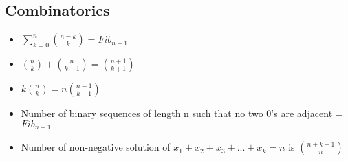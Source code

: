 \subsection{Combinatorics}
\vspace{2.5mm}
\begin{itemize}
    \item \begin{math}
        \sum\limits_{k =0}^n\binom{n-k}{k} = Fib_{n+1}
    \end{math}

    \item \begin{math}
        \binom{n}{k} + \binom{n}{k+1} = \binom{n+1}{k+1}
    \end{math}

    \item \begin{math}
        k \binom{n}{k}  = n\binom{n-1}{k-1}
    \end{math}
    \item Number of binary sequences of length n such that no two 0's are adjacent = $Fib_{n+1}$
    \item Number of non-negative solution of $x_1 + x_2 + x_3 + ... + x_k = n$ is $\binom{n+k-1}{n}$
\end{itemize}
